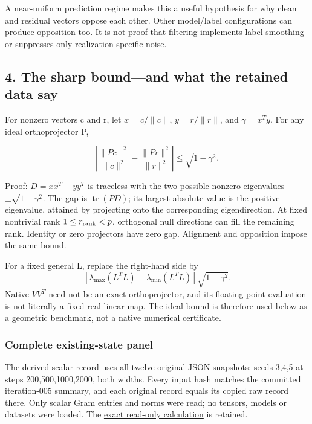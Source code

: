 \documentclass[
  british,
  10pt,
  a4paper,
]{article}
\begin{document}
A near-\allowbreak{}uniform prediction regime makes this a useful
hypothesis for why clean and residual vectors oppose each other. Other
model/\allowbreak{}label configurations can produce opposition too. It
is not proof that filtering implements label smoothing or suppresses
only realization-\allowbreak{}specific noise.

\subsection{4. The sharp bound---and what the retained data
say}\label{label-noise--the-sharp-boundand-what-the-retained-data-say}

For nonzero vectors c and r, let \(x=c/\|c\|\), \(y=r/\|r\|\), and
\(\gamma=x^Ty\). For any ideal orthoprojector P,

\[
\left|\frac{\|Pc\|^2}{\|c\|^2}
-\frac{\|Pr\|^2}{\|r\|^2}\right|
\le \sqrt{1-\gamma^2}.
\]

Proof: \(D=xx^T-yy^T\) is traceless with the two possible nonzero
eigenvalues \(\pm\sqrt{1-\gamma^2}\). The gap is
\(\operatorname{tr}(PD)\); its largest absolute value is the positive
eigenvalue,\allowbreak{} attained by projecting onto the corresponding
eigendirecti\allowbreak{}on.\allowbreak{} At fixed nontrivial rank
\(1\le r_{\rm rank}<p\), orthogonal null directions can fill the
remaining rank. Identity or zero projectors have zero gap. Alignment and
opposition impose the same bound.

For a fixed general L, replace the right-hand side by \[
[\lambda_{\max}(L^TL)-\lambda_{\min}(L^TL)]\sqrt{1-\gamma^2}.
\] Native \(VV^T\) need not be an exact
orthoproject\allowbreak{}or,\allowbreak{} and its
floating-\allowbreak{}point evaluation is not literally a fixed
real-\allowbreak{}linear map. The ideal bound is therefore used below as
a geometric benchmark, not a native numerical certificate.\allowbreak{}

\subsubsection{\texorpdfstring{Complete existing-\allowbreak{}state
panel}{Complete  panel}}\label{label-noise--complete-existing-state-panel}

The \href{../analysis/retention-identifiability-derived.json}{derived
scalar record} uses all twelve original JSON snapshots: seeds 3,4,5 at
steps
200,\allowbreak{}500,\allowbreak{}1000,\allowbreak{}2000,\allowbreak{}
both widths. Every input hash matches the committed
iteration-\allowbreak{}005 summary, and each original record equals its
copied raw record there. Only scalar Gram entries and norms were read;
no tensors, models or datasets were loaded. The
\href{../analysis/retention-identifiability-calculation.md}{exact
read-only calculation} is retained.
\end{document}
